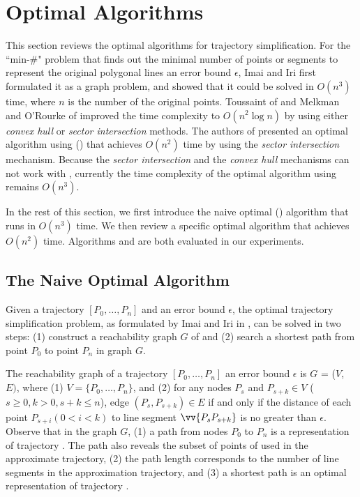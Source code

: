 \section{Optimal Algorithms}
\label{sec-optimal}

This section reviews the optimal \lsa algorithms for trajectory simplification.
For the ``min-\#" problem that finds out the minimal number of points or segments to represent the original polygonal lines \wrt an error bound $\epsilon$, Imai and Iri \cite{Imai:Optimal} first formulated it as a graph problem, and showed that it could be solved in  $O(n^3)$ time, where $n$ is the number of the original points.
%
Toussaint of \cite{Toussaint:Optimal} and Melkman and O'Rourke of \cite{Melkman:Optimal} improved the time complexity to $O(n^2 \log n)$ by using either \textit{convex hull} or \textit{sector intersection} methods.
%
The authors of \cite{Chan:Optimal} presented an optimal algorithm using \ped (\optp) that achieves $O(n^2)$ time by using the \textit{sector intersection} mechanism.
Because the \textit{sector intersection} and the \textit{convex hull} mechanisms can not work with \sed, currently the time complexity of the optimal algorithm using \sed remains $O(n^3)$.


In the rest of this section, we first introduce the naive optimal (\opt) algorithm \cite{Imai:Optimal} that runs in $O(n^3)$ time. We then review a \ped specific optimal algorithm \optp \cite{Chan:Optimal} that achieves $O(n^2)$ time. 
Algorithms \opt and \optp are both evaluated in our experiments.

\subsection{The Naive Optimal Algorithm}
Given a trajectory ${[P_0, \ldots, P_n]}$ and an error bound $\epsilon$, the optimal trajectory simplification problem, as formulated by Imai and Iri in \cite{Imai:Optimal}, can be solved in two steps: (1) construct a reachability graph $G$ of  and (2) search a shortest path from point $P_0$ to point $P_{n}$ in graph $G$.

The reachability graph of a trajectory ${[P_0, \ldots, P_n]}$ \wrt an error bound $\epsilon$ is $G$ = ($V$, $E)$, where (1) $V = \{P_0, \ldots, P_n\}$, and (2) for any nodes $P_s$ and $P_{s+k} \in V$ ($s\ge 0, k>0, s+k\le n$), edge $(P_s, P_{s+k}) \in E$ if and only if the distance of each point $P_{s+i} (0<i<k)$ to line segment $\vv{P_sP_{s+k}}$ is no greater than $\epsilon$.
%
Observe that in the graph $G$, (1) a path from nodes $P_0$ to $P_{n}$ is a representation of trajectory . The path also reveals the subset of points of  used in the approximate trajectory, (2) the path length corresponds to the number of line segments in the approximation trajectory, and 
(3) a shortest path is an optimal representation of trajectory .

